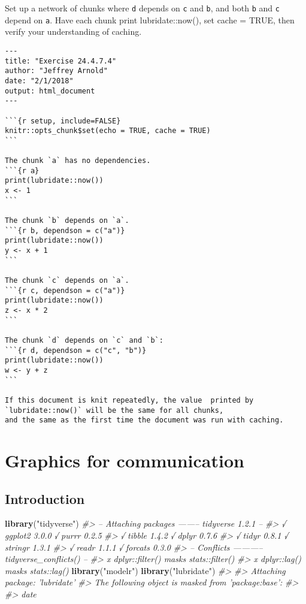 \documentclass[]{book}
\newenvironment{Shaded}{\begin{snugshade}}{\end{snugshade}}
\newcommand{\CommentTok}[1]{\textcolor[rgb]{0.56,0.35,0.01}{\textit{#1}}}
\newcommand{\KeywordTok}[1]{\textcolor[rgb]{0.13,0.29,0.53}{\textbf{#1}}}
\newcommand{\NormalTok}[1]{#1}
\newcommand{\StringTok}[1]{\textcolor[rgb]{0.31,0.60,0.02}{#1}}
\theoremstyle{plain}
\theoremstyle{remark}
\theoremstyle{definition}
\theoremstyle{definition}
\theoremstyle{definition}
\theoremstyle{remark}
\begin{document}
Set up a network of chunks where \texttt{d} depends on \texttt{c} and
\texttt{b}, and both \texttt{b} and \texttt{c} depend on \texttt{a}.
Have each chunk print lubridate::now(), set cache = TRUE, then verify
your understanding of caching.

\begin{verbatim}
---
title: "Exercise 24.4.7.4"
author: "Jeffrey Arnold"
date: "2/1/2018"
output: html_document
---

```{r setup, include=FALSE}
knitr::opts_chunk$set(echo = TRUE, cache = TRUE)
```

The chunk `a` has no dependencies.
```{r a}
print(lubridate::now())
x <- 1
```

The chunk `b` depends on `a`.
```{r b, dependson = c("a")}
print(lubridate::now())
y <- x + 1
```

The chunk `c` depends on `a`.
```{r c, dependson = c("a")}
print(lubridate::now())
z <- x * 2
```

The chunk `d` depends on `c` and `b`:
```{r d, dependson = c("c", "b")}
print(lubridate::now())
w <- y + z
```

If this document is knit repeatedly, the value  printed by `lubridate::now()` will be the same for all chunks,
and the same as the first time the document was run with caching.
\end{verbatim}

\hypertarget{graphics-for-communication}{%
\chapter{Graphics for communication}\label{graphics-for-communication}}

\hypertarget{introduction-17}{%
\section{Introduction}\label{introduction-17}}

\begin{Shaded}
\begin{Highlighting}[]
\KeywordTok{library}\NormalTok{(}\StringTok{"tidyverse"}\NormalTok{)}
\CommentTok{#> -- Attaching packages -------- tidyverse 1.2.1 --}
\CommentTok{#> √ ggplot2 3.0.0     √ purrr   0.2.5}
\CommentTok{#> √ tibble  1.4.2     √ dplyr   0.7.6}
\CommentTok{#> √ tidyr   0.8.1     √ stringr 1.3.1}
\CommentTok{#> √ readr   1.1.1     √ forcats 0.3.0}
\CommentTok{#> -- Conflicts ----------- tidyverse_conflicts() --}
\CommentTok{#> x dplyr::filter() masks stats::filter()}
\CommentTok{#> x dplyr::lag()    masks stats::lag()}
\KeywordTok{library}\NormalTok{(}\StringTok{"modelr"}\NormalTok{)}
\KeywordTok{library}\NormalTok{(}\StringTok{"lubridate"}\NormalTok{)}
\CommentTok{#> }
\CommentTok{#> Attaching package: 'lubridate'}
\CommentTok{#> The following object is masked from 'package:base':}
\CommentTok{#> }
\CommentTok{#>     date}
\end{Highlighting}
\end{Shaded}
\end{document}
